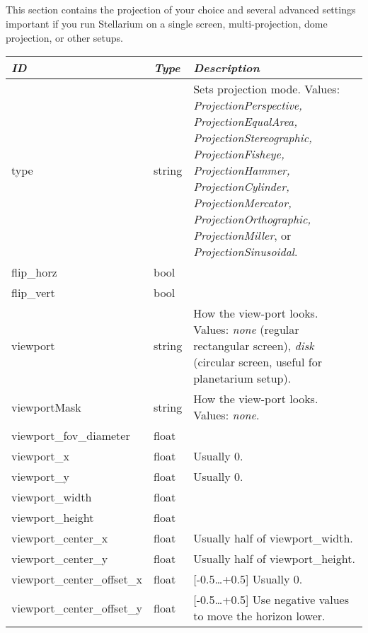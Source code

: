 \subsection{}\label{sec:config.ini:projection}

This section contains the projection of your choice and several
advanced settings important if you run Stellarium on a single screen,
multi-projection, dome projection, or other setups.

\begin{longtabu} to \textwidth {l|l|X}\toprule
\emph{ID} & \emph{Type} & \emph{Description}\\\midrule
type & string & Sets projection mode. Values: \emph{ProjectionPerspective,
                ProjectionEqualArea, ProjectionStereographic, ProjectionFisheye,
                ProjectionHammer, ProjectionCylinder, ProjectionMercator,
                ProjectionOrthographic, ProjectionMiller}, or \emph{ProjectionSinusoidal}.\\\midrule
flip\_horz                   & bool & \\\midrule
flip\_vert                   & bool & \\\midrule
viewport & string & How the view-port looks. Values: \emph{none} (regular rectangular screen), 
                    \emph{disk} (circular screen, useful for planetarium setup).\\\midrule
viewportMask & string & How the view-port looks. Values: \emph{none}.\\\midrule %
viewport\_fov\_diameter & float & \\\midrule
viewport\_x & float & Usually 0. \\\midrule
viewport\_y & float & Usually 0. \\\midrule
viewport\_width & float & \\\midrule
viewport\_height & float & \\\midrule
viewport\_center\_x & float & Usually half of viewport\_width. \\\midrule
viewport\_center\_y & float & Usually half of viewport\_height. \\\midrule
viewport\_center\_offset\_x & float & [-0.5\ldots+0.5] Usually 0. \\\midrule
viewport\_center\_offset\_y & float & [-0.5\ldots+0.5] Use negative values to move the horizon lower. \\
\bottomrule
\end{longtabu}


